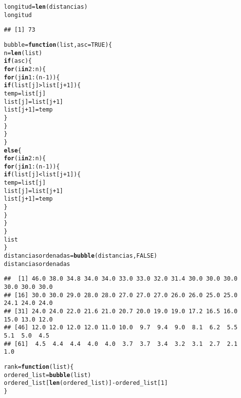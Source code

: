 \documentclass[12pt]{report}\usepackage[]{graphicx}\usepackage[dvipsnames]{xcolor}
\makeatletter
\newcommand{\hlnum}[1]{\textcolor[rgb]{0.686,0.059,0.569}{#1}}%
\newcommand{\hlopt}[1]{\textcolor[rgb]{0,0,0}{#1}}%
\newcommand{\hlstd}[1]{\textcolor[rgb]{0.345,0.345,0.345}{#1}}%
\newcommand{\hlkwa}[1]{\textcolor[rgb]{0.161,0.373,0.58}{\textbf{#1}}}%
\newcommand{\hlkwb}[1]{\textcolor[rgb]{0.69,0.353,0.396}{#1}}%
\newcommand{\hlkwc}[1]{\textcolor[rgb]{0.333,0.667,0.333}{#1}}%
\newcommand{\hlkwd}[1]{\textcolor[rgb]{0.737,0.353,0.396}{\textbf{#1}}}%
\newenvironment{kframe}{%
 \def\at@end@of@kframe{}%
 \ifinner\ifhmode%
  \def\at@end@of@kframe{\end{minipage}}%
  \begin{minipage}{\columnwidth}%
 \fi\fi%
 \def\FrameCommand##1{\hskip\@totalleftmargin \hskip-\fboxsep
 \colorbox{shadecolor}{##1}\hskip-\fboxsep
     \hskip-\linewidth \hskip-\@totalleftmargin \hskip\columnwidth}%
 \MakeFramed {\advance\hsize-\width
   \@totalleftmargin\z@ \linewidth\hsize
   \@setminipage}}%
 {\par\unskip\endMakeFramed%
 \at@end@of@kframe}
\newenvironment{knitrout}{}{} %
\makeatother
\begin{document}
\begin{knitrout}
\begin{kframe}
\begin{alltt}
\hlstd{longitud} \hlkwb{=} \hlkwd{len}\hlstd{(distancias)}
\hlstd{longitud}
\end{alltt}
\begin{verbatim}
## [1] 73
\end{verbatim}
\begin{alltt}
\hlstd{bubble} \hlkwb{=} \hlkwa{function}\hlstd{(}\hlkwc{list}\hlstd{,} \hlkwc{asc} \hlstd{=} \hlnum{TRUE}\hlstd{)\{}
        \hlstd{n} \hlkwb{=} \hlkwd{len}\hlstd{(list)}
        \hlkwa{if}\hlstd{(asc)\{}
                \hlkwa{for} \hlstd{(i} \hlkwa{in} \hlnum{2}\hlopt{:}\hlstd{n)\{}
                        \hlkwa{for} \hlstd{(j} \hlkwa{in} \hlnum{1}\hlopt{:}\hlstd{(n}\hlopt{-}\hlnum{1}\hlstd{))\{}
                                \hlkwa{if} \hlstd{(list[j]} \hlopt{>} \hlstd{list[j}\hlopt{+}\hlnum{1}\hlstd{])\{}
                                        \hlstd{temp} \hlkwb{=} \hlstd{list[j]}
                                        \hlstd{list[j]} \hlkwb{=} \hlstd{list[j}\hlopt{+}\hlnum{1}\hlstd{]}
                                        \hlstd{list[j}\hlopt{+}\hlnum{1}\hlstd{]} \hlkwb{=} \hlstd{temp}
                                \hlstd{\}}
                        \hlstd{\}}
                \hlstd{\}}
        \hlstd{\}}
        \hlkwa{else} \hlstd{\{}
                \hlkwa{for} \hlstd{(i} \hlkwa{in} \hlnum{2}\hlopt{:}\hlstd{n)\{}
                        \hlkwa{for} \hlstd{(j} \hlkwa{in} \hlnum{1}\hlopt{:}\hlstd{(n}\hlopt{-}\hlnum{1}\hlstd{))\{}
                                \hlkwa{if} \hlstd{(list[j]} \hlopt{<} \hlstd{list[j}\hlopt{+}\hlnum{1}\hlstd{])\{}
                                        \hlstd{temp} \hlkwb{=} \hlstd{list[j]}
                                        \hlstd{list[j]} \hlkwb{=} \hlstd{list[j}\hlopt{+}\hlnum{1}\hlstd{]}
                                        \hlstd{list[j}\hlopt{+}\hlnum{1}\hlstd{]} \hlkwb{=} \hlstd{temp}
                                \hlstd{\}}
                        \hlstd{\}}
                \hlstd{\}}
        \hlstd{\}}
        \hlstd{list}
\hlstd{\}}
\hlstd{distanciasordenadas} \hlkwb{=} \hlkwd{bubble}\hlstd{(distancias,} \hlnum{FALSE}\hlstd{)}
\hlstd{distanciasordenadas}
\end{alltt}
\begin{verbatim}
##  [1] 46.0 38.0 34.8 34.0 34.0 33.0 33.0 32.0 31.4 30.0 30.0 30.0 30.0 30.0 30.0
## [16] 30.0 30.0 29.0 28.0 28.0 27.0 27.0 27.0 26.0 26.0 25.0 25.0 24.1 24.0 24.0
## [31] 24.0 24.0 22.0 21.6 21.0 20.7 20.0 19.0 19.0 17.2 16.5 16.0 15.0 13.0 12.0
## [46] 12.0 12.0 12.0 12.0 11.0 10.0  9.7  9.4  9.0  8.1  6.2  5.5  5.1  5.0  4.5
## [61]  4.5  4.4  4.4  4.0  4.0  3.7  3.7  3.4  3.2  3.1  2.7  2.1  1.0
\end{verbatim}
\begin{alltt}
\hlstd{rank} \hlkwb{=} \hlkwa{function}\hlstd{(}\hlkwc{list}\hlstd{)\{}
        \hlstd{ordered_list} \hlkwb{=} \hlkwd{bubble}\hlstd{(list)}
        \hlstd{ordered_list[}\hlkwd{len}\hlstd{(ordered_list)]} \hlopt{-} \hlstd{ordered_list[}\hlnum{1}\hlstd{]}
\hlstd{\}}


\end{alltt}
\end{kframe}
\end{knitrout}
\end{document}

